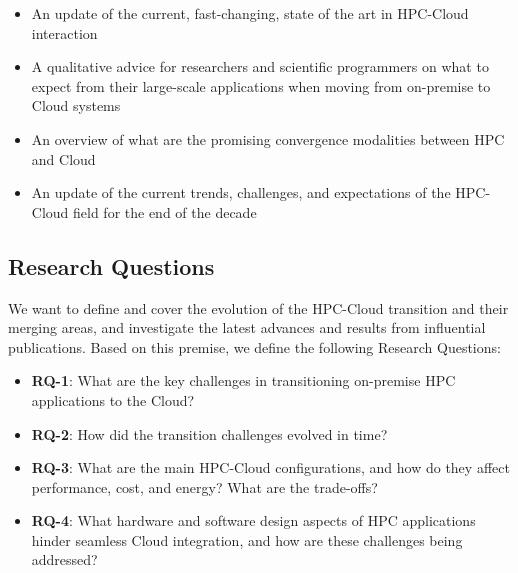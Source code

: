     \begin{center}
        \begin{itemize}
            \item [\textbf{Con-1}] An update of the current, fast-changing, state of the art in HPC-Cloud interaction
            \item [\textbf{Con-2}] A qualitative advice for researchers and scientific programmers on what to expect from their large-scale applications when moving from on-premise to Cloud systems
            \item [\textbf{Con-3}] An overview of what are the promising convergence modalities between HPC and Cloud
            \item [\textbf{Con-4}] An update of the current trends, challenges, and expectations of the HPC-Cloud field for the end of the decade
        \end{itemize}
    \end{center}


\subsection{Research Questions}
\label{sec:questions}
We want to define and cover the evolution of the HPC-Cloud transition and their merging areas, and investigate the latest advances and results from influential publications. Based on this premise, we define the following Research Questions:\\


\begin{itemize}
    \item \textbf{RQ-1}: What are the key challenges in transitioning on-premise HPC applications to the Cloud?
    \item \textbf{RQ-2}: How did the transition challenges evolved in time?
    \item \textbf{RQ-3}: What are the main HPC-Cloud configurations, and how do they affect performance, cost, and energy? What are the trade-offs?
    \item \textbf{RQ-4}: What hardware and software design aspects of HPC applications hinder seamless Cloud integration, and how are these challenges being addressed?
\end{itemize}




